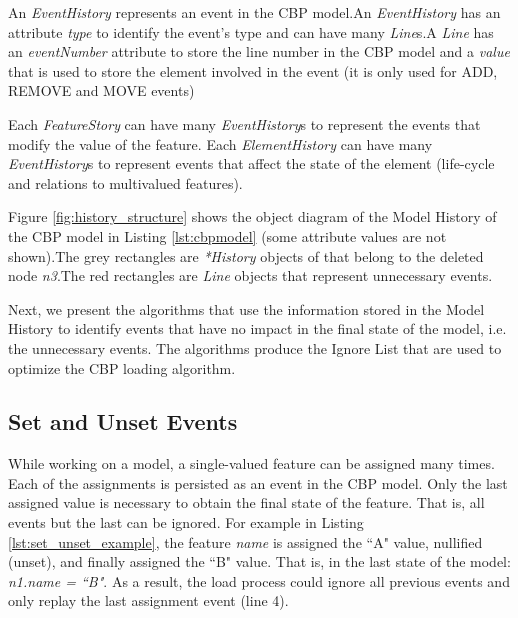 \documentclass{llncs}
\begin{document}
An \emph{EventHistory} represents an event in the CBP model.An \emph{EventHistory} has an attribute \emph{type} to identify the event's type and can have many \emph{Line}s.A \emph{Line} has an \emph{eventNumber} attribute to store the line number in the CBP model and a \emph{value} that is used to store the element involved in the event (it is only used for ADD, REMOVE and MOVE events)

Each \emph{FeatureStory} can have many \emph{EventHistory}s  to represent the events that modify the value of the feature.
Each \emph{ElementHistory}  can have many \emph{EventHistory}s to represent events that affect the state of the element (life-cycle and relations to multivalued features).

Figure \ref{fig:history_structure} shows the object diagram of the Model History of the CBP model in Listing \ref{lst:cbpmodel} (some attribute values are not shown).The grey rectangles are \emph{*History} objects of that belong to the deleted node \emph{n3}.The red rectangles are \emph{Line} objects that represent unnecessary events.

Next, we present the algorithms that use the information stored in the Model History to identify events that have no impact in the final state of the model, i.e. the unnecessary events. The algorithms produce the Ignore List that are used to optimize the CBP loading algorithm.

\subsection{Set and Unset Events}
\label{subsec:set_and_unset_events}
While working on a model, a single-valued feature can be assigned many times.
Each of the assignments is persisted as an event in the CBP model.
Only the last assigned value is necessary to obtain the final state of the feature. 
That is, all events but the last can be ignored.
For example in Listing \ref{lst:set_unset_example}, the feature \emph{name} is assigned the ``A" value, nullified (unset), and finally assigned the ``B" value.
That is, in the last state of the model: \emph{n1.name = ``B"}.
As a result, the load process could ignore all previous events and only replay the last assignment event (line 4). 
\end{document}
